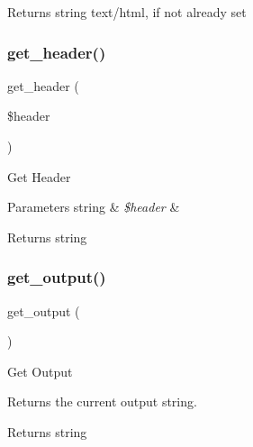 \begin{DoxyReturn}{Returns}
string \textquotesingle{}text/html\textquotesingle{}, if not already set 
\end{DoxyReturn}
\mbox{\label{class_c_i___output_afc84ca7f4f93817160ea738f2f899a74}} 
\subsubsection{\texorpdfstring{get\+\_\+header()}{get\_header()}}
{\footnotesize\ttfamily get\+\_\+header (\begin{DoxyParamCaption}\item[{}]{\$header }\end{DoxyParamCaption})}

Get Header


\begin{DoxyParams}[1]{Parameters}
string & {\em \$header} & \\
\hline
\end{DoxyParams}
\begin{DoxyReturn}{Returns}
string 
\end{DoxyReturn}
\mbox{\label{class_c_i___output_aa6c3f8688f804de4f1af8a462fffb922}} 
\subsubsection{\texorpdfstring{get\+\_\+output()}{get\_output()}}
{\footnotesize\ttfamily get\+\_\+output (\begin{DoxyParamCaption}{ }\end{DoxyParamCaption})}

Get Output

Returns the current output string.

\begin{DoxyReturn}{Returns}
string 
\end{DoxyReturn}
\mbox{\label{class_c_i___output_acd24befdfc26233abfbdc62071dcd58b}} 
